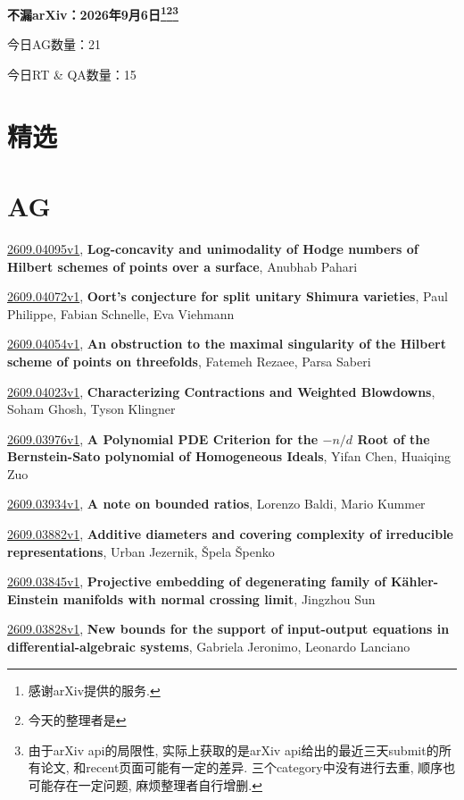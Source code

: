 \documentclass[9pt, a4paper]{article}
\theoremstyle{plain}
\theoremstyle{definition}
\theoremstyle{remark}
\newcommand{\arxiv}[3]{\href{https://arxiv.org/abs/#1}{#1}, \textbf{\textcolor{arxivblue}{#2}}, #3}
\newcommand{\AGnumber}{21}
\newcommand{\RTQAnumber}{15}
\newcommand{\NewestDate}{2026年9月6日}
\newcommand{\todayarXiver}{} %
\begin{document}
\begin{center}
    \Huge\textbf{不漏arXiv：\NewestDate\footnote{感谢arXiv提供的服务.}\footnote{今天的整理者是\todayarXiver}\footnote{由于arXiv api的局限性, 实际上获取的是arXiv api给出的最近三天submit的所有论文, 和recent页面可能有一定的差异. 三个category中没有进行去重, 顺序也可能存在一定问题, 麻烦整理者自行增删.}} \\
\end{center}

\setcounter{section}{-1}

\begin{center}
    今日AG数量：\AGnumber
    
    今日RT \& QA数量：\RTQAnumber
    
\end{center}


\section{精选}


\section{AG}
\arxiv{2609.04095v1}{Log-concavity and unimodality of Hodge numbers of Hilbert schemes of points over a surface}{Anubhab Pahari}

\arxiv{2609.04072v1}{Oort's conjecture for split unitary Shimura varieties}{Paul Philippe, Fabian Schnelle, Eva Viehmann}

\arxiv{2609.04054v1}{An obstruction to the maximal singularity of the Hilbert scheme of points on threefolds}{Fatemeh Rezaee, Parsa Saberi}

\arxiv{2609.04023v1}{Characterizing Contractions and Weighted Blowdowns}{Soham Ghosh, Tyson Klingner}

\arxiv{2609.03976v1}{A Polynomial PDE Criterion for the $-n/d$ Root of the Bernstein-Sato polynomial of Homogeneous Ideals}{Yifan Chen, Huaiqing Zuo}

\arxiv{2609.03934v1}{A note on bounded ratios}{Lorenzo Baldi, Mario Kummer}

\arxiv{2609.03882v1}{Additive diameters and covering complexity of irreducible representations}{Urban Jezernik, Špela Špenko}

\arxiv{2609.03845v1}{Projective embedding of degenerating family of Kähler-Einstein manifolds with normal crossing limit}{Jingzhou Sun}

\arxiv{2609.03828v1}{New bounds for the support of input-output equations in differential-algebraic systems}{Gabriela Jeronimo, Leonardo Lanciano}
\end{document}

